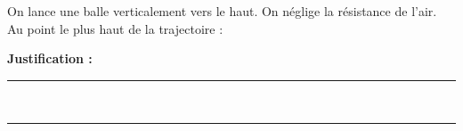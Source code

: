 On lance une balle verticalement vers le haut. On néglige la résistance de l'air. Au point le plus haut de la trajectoire :

\choices

\noindent\textbf{Justification :} \hrulefill \\[2.5ex]
\rule{\linewidth}{0.4pt} \\[2.5ex]
\rule{\linewidth}{0.4pt}
\vfill
